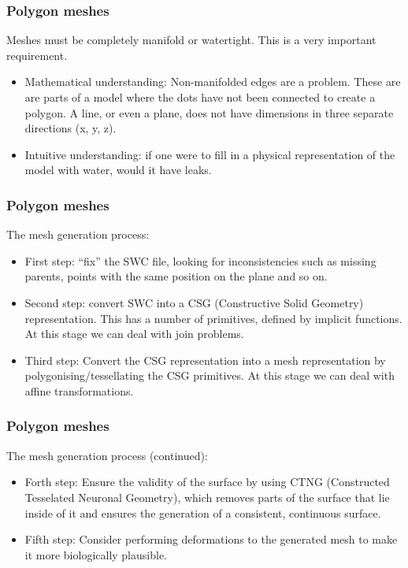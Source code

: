 \documentclass{beamer}
\begin{document}
\begin{frame}
\frametitle{Polygon meshes}

Meshes must be completely manifold or watertight. This is a very
important requirement.
\pause

\begin{itemize}
\item Mathematical understanding: Non-manifolded edges are a
  problem. These are are parts of a model where the dots have not been
  connected to create a polygon. A line, or even a plane, does not have
  dimensions in three separate directions (x, y, z).
\pause
\item Intuitive understanding: if one were to fill in a physical
  representation of the model with water, would it have leaks.
\end{itemize}

\end{frame}

\begin{frame}
\frametitle{Polygon meshes}

The mesh generation process:

\begin{itemize}
\item First step: ``fix'' the SWC file, looking for
  inconsistencies such as missing parents, points with the same
  position on the plane and so on.
\pause
\item Second step: convert SWC into a CSG (Constructive Solid Geometry)
  representation. This has a number of primitives, defined by implicit
  functions. At this stage we can deal with join problems.
\pause
\item Third step: Convert the CSG representation into a mesh
  representation by polygonising/tessellating the CSG primitives. At
  this stage we can deal with affine transformations.
\end{itemize}

\end{frame}

\begin{frame}
\frametitle{Polygon meshes}

The mesh generation process (continued):

\begin{itemize}
\item Forth step: Ensure the validity of the surface by using CTNG
  (Constructed Tesselated Neuronal Geometry), which removes parts of
  the surface that lie inside of it and ensures the generation of a
  consistent, continuous surface.
\pause
\item Fifth step: Consider performing deformations to the generated
  mesh to make it more biologically plausible.
\end{itemize}

\end{frame}
\end{document}

